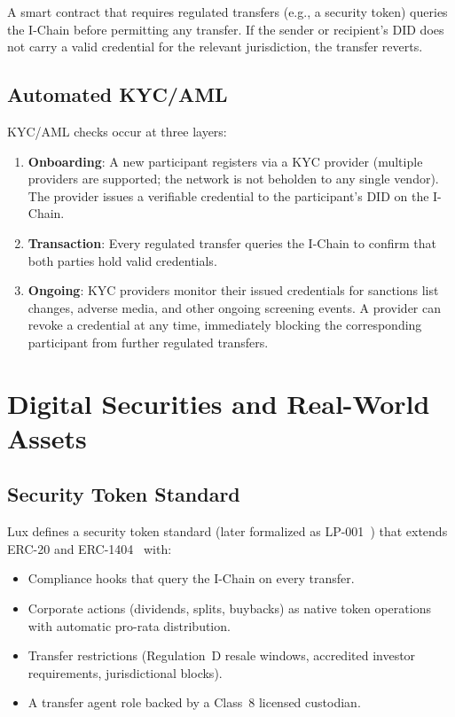 \documentclass[11pt,a4paper]{article}
\begin{document}
A smart contract that requires regulated transfers (e.g., a
security token) queries the I-Chain before permitting any transfer.
If the sender or recipient's DID does not carry a valid credential
for the relevant jurisdiction, the transfer reverts.

\subsection{Automated KYC/AML}

KYC/AML checks occur at three layers:

\begin{enumerate}[nosep]
  \item \textbf{Onboarding}: A new participant registers via a KYC
        provider (multiple providers are supported; the network is
        not beholden to any single vendor). The provider issues a
        verifiable credential to the participant's DID on the
        I-Chain.
  \item \textbf{Transaction}: Every regulated transfer queries the
        I-Chain to confirm that both parties hold valid credentials.
  \item \textbf{Ongoing}: KYC providers monitor their issued
        credentials for sanctions list changes, adverse media, and
        other ongoing screening events. A provider can revoke a
        credential at any time, immediately blocking the
        corresponding participant from further regulated transfers.
\end{enumerate}

\section{Digital Securities and Real-World Assets}

\subsection{Security Token Standard}

Lux defines a security token standard (later formalized as
LP-001~\cite{lp-001-securities}) that extends ERC-20 and
ERC-1404~\cite{erc1404} with:

\begin{itemize}[nosep]
  \item Compliance hooks that query the I-Chain on every transfer.
  \item Corporate actions (dividends, splits, buybacks) as native
        token operations with automatic pro-rata distribution.
  \item Transfer restrictions (Regulation~D resale windows, accredited
        investor requirements, jurisdictional blocks).
  \item A transfer agent role backed by a Class~8 licensed custodian.
\end{itemize}
\end{document}
